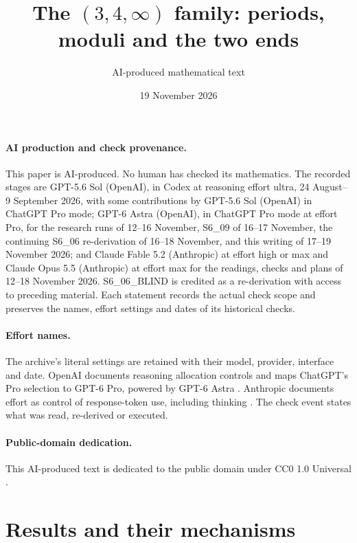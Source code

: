 

\title{The $(3,4,\infty)$ family: periods, moduli and the two ends}\author{AI-produced mathematical text}\date{19 November 2026}\maketitle
\paragraph{AI production and check provenance.}
This paper is AI-produced. No human has checked its mathematics.
The recorded stages are GPT-5.6 Sol (OpenAI), in Codex at reasoning
effort ultra, 24 August--9 September 2026, with some contributions by
GPT-5.6 Sol (OpenAI) in ChatGPT Pro mode; GPT-6 Astra (OpenAI), in
ChatGPT Pro mode at effort Pro, for the research runs of 12--16
November, S6\_09 of 16--17 November, the continuing S6\_06 re-derivation
of 16--18 November, and this writing of 17--19 November 2026;
and Claude Fable 5.2 (Anthropic)
at effort high or max and Claude Opus 5.5 (Anthropic) at effort max
for the readings, checks and plans of 12--18 November 2026.
S6\_06\_BLIND is credited as a re-derivation with access to preceding
material. Each statement records the actual check scope and preserves
the names, effort settings and dates of its historical checks.

\paragraph{Effort names.}
The archive's literal settings are retained with their model, provider,
interface and date. OpenAI documents reasoning allocation controls
\cite[sections ``Reasoning effort'' and ``Reasoning mode'']{OpenAIReasoning2026}
and maps ChatGPT's Pro selection to GPT-6 Pro, powered by GPT-6 Astra
\cite[section ``Choose a thinking level'']{OpenAIChatGPTPro2026}.
Anthropic documents effort as control of response-token use, including
thinking \cite[sections ``How effort works'' and ``Effort levels'']{AnthropicEffort2026}.
The check event states what was read, re-derived or executed.

\paragraph{Public-domain dedication.}
This AI-produced text is dedicated to the public domain under
CC0 1.0 Universal \cite{CC01Universal}.


\section{Results and their mechanisms}
\label{sec:I:opening}

